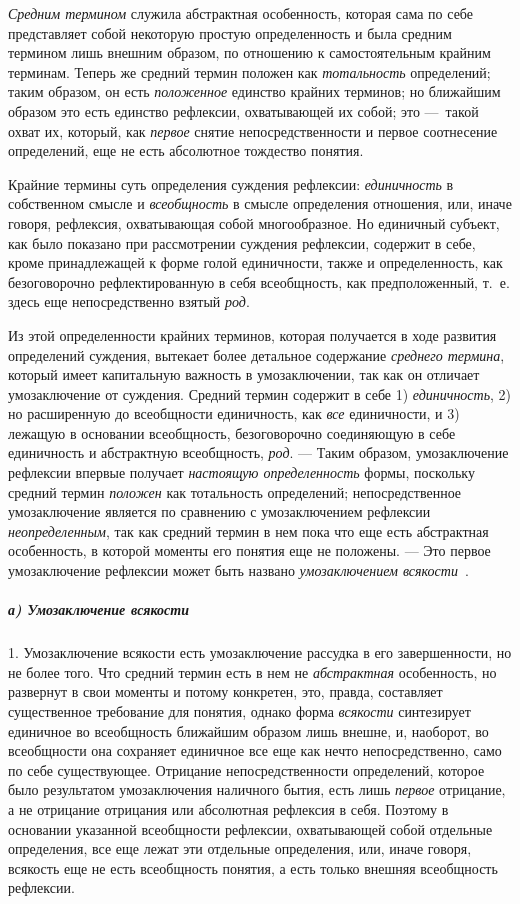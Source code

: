 \documentclass[twoside]{article}
\begin{document}
{{{{{{\em Средним термином}
служила абстрактная особенность, которая сама по себе
представляет собой некоторую простую определенность и была средним термином
лишь внешним образом, по отношению к самостоятельным крайним терминам.
Теперь же средний термин положен как
{\em тотальность}
определений; таким образом, он есть
{\em положенное} единство
крайних терминов; но ближайшим образом это есть единство рефлексии,
охватывающей их собой; это —~такой охват их, который, как
{\em первое} снятие
непосредственности и первое соотнесение определений, еще не есть абсолютное
тождество понятия.

Крайние термины суть определения суждения рефлексии:
{\em единичность} в
собственном смысле и {\em всеобщность}
в смысле определения отношения, или, иначе говоря, рефлексия,
охватывающая собой многообразное. Но единичный субъект, как было показано
при рассмотрении суждения рефлексии, содержит в себе, кроме принадлежащей к
форме голой единичности, также и определенность, как безоговорочно
рефлектированную в себя всеобщность, как предположенный, т.~е. здесь еще
непосредственно взятый {\em род}.

Из этой определенности крайних терминов, которая получается в
ходе развития определений суждения, вытекает более детальное содержание
{\em среднего термина},
который имеет капитальную важность в умозаключении, так как
он отличает умозаключение от суждения. Средний термин содержит в себе 1)
{\em единичность}, 2) но
расширенную до всеобщности единичность, как
{\em все} единичности, и
3) лежащую в основании всеобщность, безоговорочно соединяющую в себе
единичность и абстрактную всеобщность,
{\em род}. — Таким
образом, умозаключение рефлексии впервые получает
{\em настоящую определенность}
формы, поскольку средний термин
{\em положен} как
тотальность определений; непосредственное умозаключение является
по сравнению с умозаключением рефлексии
{\em неопределенным}, так
как средний термин в нем пока что еще есть абстрактная особенность, в
которой моменты его понятия еще не положены. — Это первое
умозаключение рефлексии может быть названо
{\em умозаключением
всякости}~\label{bkm:bm56}.

\subparagraph[а) Умозаключение всякости]{а) Умозаключение всякости}
1. Умозаключение всякости есть умозаключение рассудка в его
завершенности, но не более того. Что средний термин есть в нем не
{\em абстрактная}
особенность, но развернут в свои моменты и потому конкретен,
это, правда, составляет существенное требование для понятия, однако форма
{\em всякости}
синтезирует единичное во всеобщность ближайшим образом лишь
внешне, и, наоборот, во всеобщности она сохраняет единичное все еще как
нечто непосредственно, само по себе существующее. Отрицание
непосредственности определений, которое было результатом умозаключения
наличного бытия, есть лишь {\em первое}
отрицание, а не отрицание отрицания или абсолютная рефлексия
в себя. Поэтому в основании указанной всеобщности рефлексии, охватывающей
собой отдельные определения, все еще лежат эти отдельные определения, или,
иначе говоря, всякость еще не есть всеобщность понятия, а есть только
внешняя всеобщность рефлексии.

}}}}}
\end{document}
